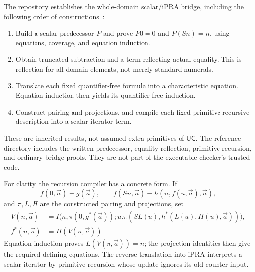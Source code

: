 \documentclass[11pt,letterpaper]{article}
\theoremstyle{definition}\newtheorem{definition}[theorem]{Definition}
\newcommand{\UC}{\mathsf{UC}}
\begin{document}
The repository establishes the whole-domain scalar/iPRA bridge, including
the following order of constructions~\cite{arithmetic,bridge}:
\begin{enumerate}
\item Build a scalar predecessor $P$ and prove $P0=0$ and $P(Sn)=n$,
using equations, coverage, and equation induction.
\item Obtain truncated subtraction and a term reflecting actual equality.
This is reflection for all domain elements, not merely standard numerals.
\item Translate each fixed quantifier-free formula into a characteristic
equation. Equation induction then yields its quantifier-free induction.
\item Construct pairing and projections, and compile each fixed primitive
recursive description into a scalar iterator term.
\end{enumerate}
These are inherited results, not assumed extra primitives of $\UC$.
The reference directory includes the written predecessor, equality
reflection, primitive recursion, and ordinary-bridge proofs. They are not
part of the executable checker's trusted code.

For clarity, the recursion compiler has a concrete form. If
\[
 f(0,\vec a)=g(\vec a),\qquad
 f(Sn,\vec a)=h(n,f(n,\vec a),\vec a),
\]
and $\pi,L,H$ are the constructed pairing and projections, set
\begin{align*}
 V(n,\vec a)&=I\bigl(n,\pi(0,g^*(\vec a));
       u.\pi(SL(u),h^*(L(u),H(u),\vec a))\bigr),\\
 f^*(n,\vec a)&=H(V(n,\vec a)).
\end{align*}
Equation induction proves $L(V(n,\vec a))=n$; the projection identities
then give the required defining equations. The reverse translation into
iPRA interprets a scalar iterator by primitive recursion whose update
ignores its old-counter input.
\end{document}
